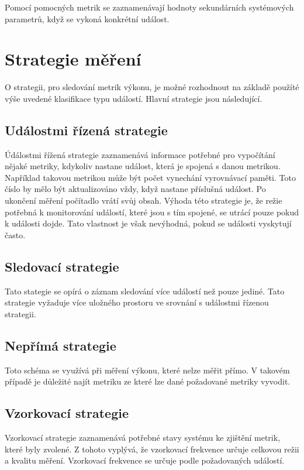 Pomocí pomocných metrik se zaznamenávají hodnoty sekundárních systémových parametrů, když se vykoná konkrétní událost.

\section{Strategie měření}

O strategii, pro sledování metrik výkonu, je možné rozhodnout na základě použíté výše uvedené klasifikace typu událostí. Hlavní strategie jsou následující.

\subsection*{Událostmi řízená strategie}

Údálostmi řížená strategie zaznamenává informace potřebné pro vypočítání nějaké metriky, kdykoliv nastane událost, která je spojená s danou metrikou. Například takovou metrikou může být počet vynechání vyrovnávací paměti. Toto číslo by mělo být aktualizováno vždy, když nastane příslušná událost. Po ukončení měření počítadlo vrátí svůj obsah. Výhoda této strategie je, že režie potřebná k monitorování událostí, které jsou s tím spojené, se utrácí pouze pokud k události dojde. Tato vlastnost je však nevýhodná, pokud se události vyskytují často.

\subsection*{Sledovací strategie}

Tato stategie se opírá o záznam sledování více událostí než pouze jediné. Tato strategie vyžaduje více uložného prostoru ve srovnání s událostmi řízenou strategii.

\subsection*{Nepřímá strategie}

Toto schéma se využívá při měření výkonu, které nelze měřit přímo. V takovém případě je důležité najít metriku ze které lze dané požadované metriky vyvodit.

\subsection*{Vzorkovací strategie}

Vzorkovací strategie zaznamenává potřebné stavy systému ke zjištění metrik, které byly zvolené. Z tohoto vyplývá, že vzorkovací frekvence určuje celkovou režii a kvalitu měření. Vzorkovací frekvence se určuje podle požadovaných událostí.

